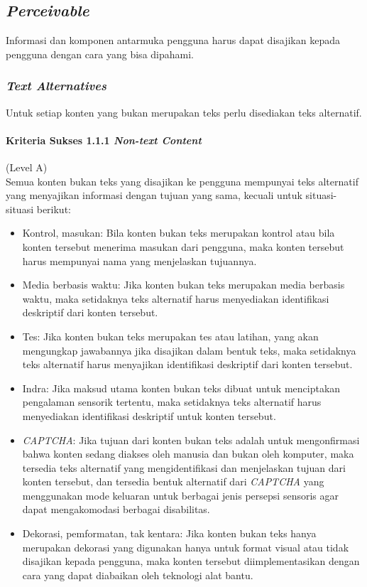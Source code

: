 \documentclass[a4paper,twoside]{article}
\begin{document}
\begin{enumerate}
		\subsection*{\textit{Perceivable}}
		\label{sec:perceivable}
		Informasi dan komponen antarmuka pengguna harus dapat disajikan kepada pengguna dengan cara yang bisa dipahami.

		\subsubsection*{\textit{Text Alternatives}}
		\label{sec:text_alternatives}
		Untuk setiap konten yang bukan merupakan teks perlu disediakan teks alternatif.

		\paragraph{Kriteria Sukses 1.1.1 \textit{Non-text Content}}
		\label{sec:kriteria_sukses_1.1.1}
		(Level A)\\

		Semua konten bukan teks yang disajikan ke pengguna mempunyai teks alternatif yang menyajikan informasi dengan tujuan yang sama, kecuali untuk situasi-situasi berikut:
		\begin{itemize}
			\item Kontrol, masukan: Bila konten bukan teks merupakan kontrol atau bila konten tersebut menerima masukan dari pengguna, maka konten tersebut harus mempunyai nama yang menjelaskan tujuannya.
			\item Media berbasis waktu: Jika konten bukan teks merupakan media berbasis waktu, maka setidaknya teks alternatif harus menyediakan identifikasi deskriptif dari konten tersebut.
			\item Tes: Jika konten bukan teks merupakan tes atau latihan, yang akan mengungkap jawabannya jika disajikan dalam bentuk teks, maka setidaknya teks alternatif harus menyajikan identifikasi deskriptif dari konten tersebut.
			\item Indra: Jika maksud utama konten bukan teks dibuat untuk menciptakan pengalaman sensorik tertentu, maka setidaknya teks alternatif harus menyediakan identifikasi deskriptif untuk konten tersebut.
			\item \textit{CAPTCHA}: Jika tujuan dari konten bukan teks adalah untuk mengonfirmasi bahwa konten sedang diakses oleh manusia dan bukan oleh komputer, maka tersedia teks alternatif yang mengidentifikasi dan menjelaskan tujuan dari konten tersebut, dan tersedia bentuk alternatif dari \textit{CAPTCHA} yang menggunakan mode keluaran untuk berbagai jenis persepsi sensoris agar dapat mengakomodasi berbagai disabilitas.
			\item Dekorasi, pemformatan, tak kentara: Jika konten bukan teks hanya merupakan dekorasi yang digunakan hanya untuk format visual atau tidak disajikan kepada pengguna, maka konten tersebut diimplementasikan dengan cara yang dapat diabaikan oleh teknologi alat bantu.
		\end{itemize}


\end{enumerate}
\end{document}
